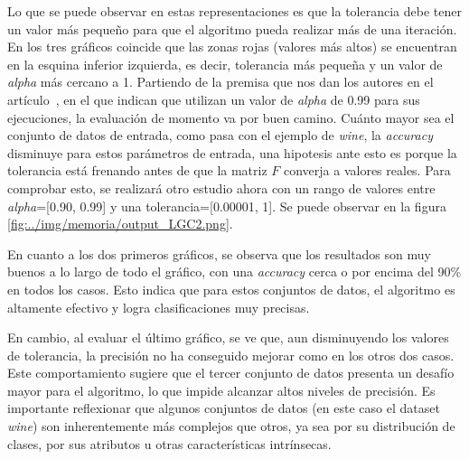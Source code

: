 Lo que se puede observar en estas representaciones es que la tolerancia debe tener un valor más pequeño para que el algoritmo pueda realizar más de una iteración. En los tres gráficos coincide que las zonas rojas (valores más altos) se encuentran en la esquina inferior izquierda, es decir, tolerancia más pequeña y un valor de \textit{alpha} más cercano a 1. Partiendo de la premisa que nos dan los autores en el artículo~\cite{LGC}, en el que indican que utilizan un valor de \textit{alpha} de 0.99 para sus ejecuciones, la evaluación de momento va por buen camino. Cuánto mayor sea el conjunto de datos de entrada, como pasa con el ejemplo de \textit{wine}, la \textit{accuracy} disminuye para estos parámetros de entrada, una hipotesis ante esto es porque la tolerancia está frenando antes de que la matriz $F$ converja a valores reales.
Para comprobar esto, se realizará otro estudio ahora con un rango de valores entre \textit{alpha}=[0.90, 0.99] y una tolerancia=[0.00001, 1]. Se puede observar en la figura \ref{fig:../img/memoria/output_LGC2.png}.

En cuanto a los dos primeros gráficos, se observa que los resultados son muy buenos a lo largo de todo el gráfico, con una \textit{accuracy} cerca o por encima del 90\% en todos los casos. Esto indica que para estos conjuntos de datos, el algoritmo es altamente efectivo y logra clasificaciones muy precisas.

En cambio, al evaluar el último gráfico, se ve que, aun disminuyendo los valores de tolerancia, la precisión no ha conseguido mejorar como en los otros dos casos. Este comportamiento sugiere que el tercer conjunto de datos presenta un desafío mayor para el algoritmo, lo que impide alcanzar altos niveles de precisión. Es importante reflexionar que algunos conjuntos de datos (en este caso el dataset \textit{wine}) son inherentemente más complejos que otros, ya sea por su distribución de clases, por sus atributos u otras características intrínsecas.
